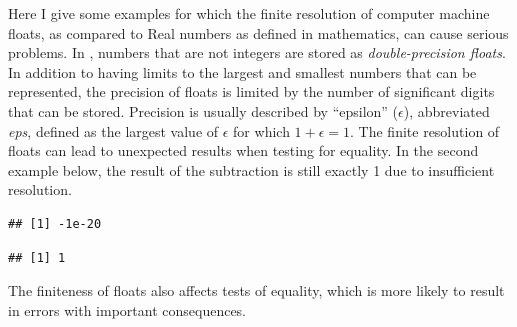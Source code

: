 \documentclass[krantz2]{krantz}\usepackage{knitr}
\begin{document}
\begin{explainbox}
\label{box:floats} \label{par:float}
%
Here I give some examples for which the finite resolution of computer machine floats, as compared to Real numbers as defined in mathematics, can cause serious problems. In \Rpgrm, numbers that are not integers are stored as \emph{double-precision floats}. In addition to having limits to the largest and smallest numbers that can be represented, the precision of floats is limited by the number of significant digits that can be stored. Precision is usually described by ``epsilon'' ($\epsilon$), abbreviated \emph{eps}, defined as the largest value of $\epsilon$ for which $1 + \epsilon = 1$. The finite resolution of floats can lead to unexpected results when testing for equality. In the second example below, the result of the subtraction is still exactly 1 due to insufficient resolution.

\begin{knitrout}\footnotesize
{}\color{fgcolor}\begin{kframe}
\begin{alltt}
 \hlopt{-} 
\end{alltt}
\begin{verbatim}
## [1] -1e-20
\end{verbatim}
\begin{alltt}
 \hlopt{-} 
\end{alltt}
\begin{verbatim}
## [1] 1
\end{verbatim}
\end{kframe}
\end{knitrout}

The finiteness of floats also affects tests of equality, which is more likely to result in errors with important consequences.


\end{explainbox}
\end{document}
